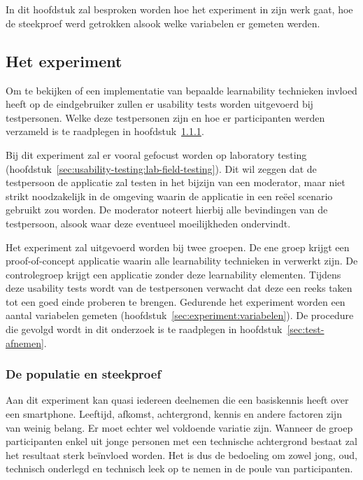 \chapter{}
\label{ch:methodologie}

In dit hoofdstuk zal besproken worden hoe het experiment in zijn werk gaat, hoe de steekproef werd getrokken alsook welke variabelen er gemeten werden.

\section{Het experiment}
\label{sec:experiment}

Om te bekijken of een implementatie van bepaalde learnability technieken invloed heeft op de eindgebruiker zullen er usability tests worden uitgevoerd bij testpersonen. Welke deze testpersonen zijn en hoe er participanten werden verzameld is te raadplegen in hoofdstuk~\ref{sec:experiment:populatie-steekproef}.

Bij dit experiment zal er vooral gefocust worden op laboratory testing (hoofdstuk~\ref{sec:usability-testing:lab-field-testing}). Dit wil zeggen dat de testpersoon de applicatie zal testen in het bijzijn van een moderator, maar niet strikt noodzakelijk in de omgeving waarin de applicatie in een reëel scenario gebruikt zou worden. De moderator noteert hierbij alle bevindingen van de testpersoon, alsook waar deze eventueel moeilijkheden ondervindt.

Het experiment zal uitgevoerd worden bij twee groepen. De ene groep krijgt een proof-of-concept applicatie waarin alle learnability technieken in verwerkt zijn. De controlegroep krijgt een applicatie zonder deze learnability elementen. Tijdens deze usability tests wordt van de testpersonen verwacht dat deze een reeks taken tot een goed einde proberen te brengen. Gedurende het experiment worden een aantal variabelen gemeten (hoofdstuk~\ref{sec:experiment:variabelen}). De procedure die gevolgd wordt in dit onderzoek is te raadplegen in hoofdstuk~\ref{sec:test-afnemen}.

\subsection{De populatie en steekproef}
\label{sec:experiment:populatie-steekproef}

Aan dit experiment kan quasi iedereen deelnemen die een basiskennis heeft over een smartphone. Leeftijd, afkomst, achtergrond, kennis en andere factoren zijn van weinig belang. Er moet echter wel voldoende variatie zijn. Wanneer de groep participanten enkel uit jonge personen met een technische achtergrond bestaat zal het resultaat sterk beïnvloed worden. Het is dus de bedoeling om zowel jong, oud, technisch onderlegd en technisch leek op te nemen in de poule van participanten.

